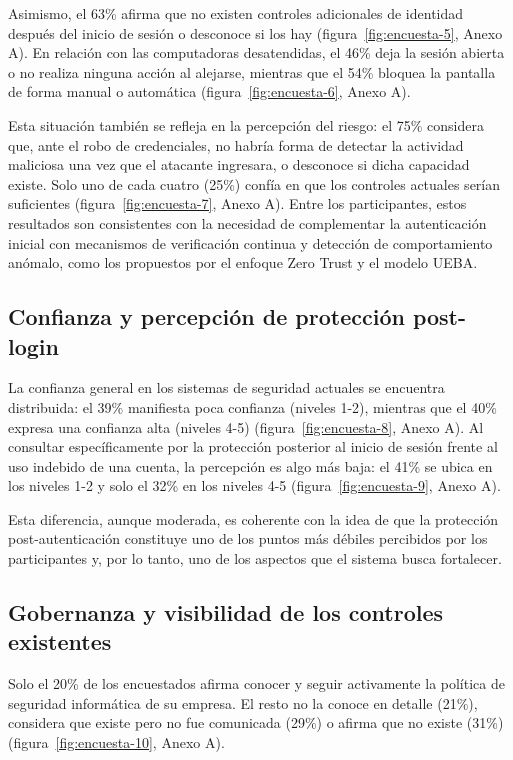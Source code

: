 Asimismo, el 63\% afirma que no existen controles adicionales de identidad después del inicio de sesión o desconoce si los hay (figura~\ref{fig:encuesta-5}, Anexo A). En relación con las computadoras desatendidas, el 46\% deja la sesión abierta o no realiza ninguna acción al alejarse, mientras que el 54\% bloquea la pantalla de forma manual o automática (figura~\ref{fig:encuesta-6}, Anexo A).

Esta situación también se refleja en la percepción del riesgo: el 75\% considera que, ante el robo de credenciales, no habría forma de detectar la actividad maliciosa una vez que el atacante ingresara, o desconoce si dicha capacidad existe. Solo uno de cada cuatro (25\%) confía en que los controles actuales serían suficientes (figura~\ref{fig:encuesta-7}, Anexo A). Entre los participantes, estos resultados son consistentes con la necesidad de complementar la autenticación inicial con mecanismos de verificación continua y detección de comportamiento anómalo, como los propuestos por el enfoque Zero Trust y el modelo UEBA.

\subsection{Confianza y percepción de protección post-login}

La confianza general en los sistemas de seguridad actuales se encuentra distribuida: el 39\% manifiesta poca confianza (niveles 1-2), mientras que el 40\% expresa una confianza alta (niveles 4-5) (figura~\ref{fig:encuesta-8}, Anexo A). Al consultar específicamente por la protección posterior al inicio de sesión frente al uso indebido de una cuenta, la percepción es algo más baja: el 41\% se ubica en los niveles 1-2 y solo el 32\% en los niveles 4-5 (figura~\ref{fig:encuesta-9}, Anexo A).

Esta diferencia, aunque moderada, es coherente con la idea de que la protección post-autenticación constituye uno de los puntos más débiles percibidos por los participantes y, por lo tanto, uno de los aspectos que el sistema busca fortalecer.

\subsection{Gobernanza y visibilidad de los controles existentes}

Solo el 20\% de los encuestados afirma conocer y seguir activamente la política de seguridad informática de su empresa. El resto no la conoce en detalle (21\%), considera que existe pero no fue comunicada (29\%) o afirma que no existe (31\%) (figura~\ref{fig:encuesta-10}, Anexo A).

